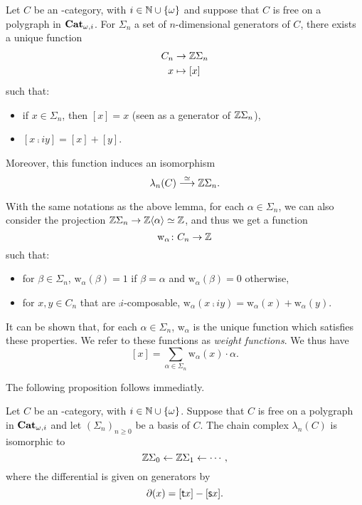 \documentclass{amsart}
\renewcommand{\sce}[1]{\source{} #1}
\renewcommand{\tge}[1]{\target{} #1}
\newcommand{\wght}[1]{\mathrm{w}_{#1}}
\begin{document}
\begin{lemma}\label{lemma:abelpol}
  Let $C$ be an \nbd-category, with $i \in \mathbb N\cup\left\{\omega\right\}$
  and suppose that $C$ is free on a polygraph in $\mathbf{Cat}_{\omega,i}$. For
  $\Sigma_n$ a set of $n$\nbd-dimensional generators of $C$, there
  exists a unique function
  \[
    \begin{aligned}
      C_n &\to \mathbb Z\Sigma_n\\
      x &\mapsto [x]
    \end{aligned}
  \]
  such that:
  \begin{itemize}
    \item if $x \in \Sigma_n$, then $[x]=x$ (seen as a generator of
      $\mathbb Z\Sigma_n$),
    \item $[x\comp{i} y]=[x]+[y]$.
    \end{itemize}
    Moreover, this function induces an isomorphism
    \[
      \lambda_n(C) \overset{\simeq}{\longrightarrow} \mathbb Z\Sigma_n.
    \]
  \end{lemma}
  \begin{paragr}
  With the same notations as the above lemma, for each $\alpha \in
  \Sigma_n$, we can also consider the projection $\mathbb Z \Sigma_n \to \mathbb Z
  \langle \alpha \rangle \simeq \mathbb Z$, and thus we get a
  function
  \[
    \wght{\alpha} \colon C_n \to \Z
  \]
  such that:
  \begin{itemize}
    \item for $\beta \in \Sigma_n$, $\wght{\alpha}(\beta)=1$ if $\beta=\alpha$ and $\wght{\alpha}(\beta)=0$
      otherwise,
    \item for $x,y \in C_n$ that are $\comp{i}$\nbd-composable, $\wght{\alpha}(x\comp{i}y)=\wght{\alpha}(x)+\wght{\alpha}(y)$.
    \end{itemize}
    It can be shown that, for each $\alpha \in \Sigma_n$, $\wght{\alpha}$ is the unique function which
    satisfies these properties. We refer to these functions as \emph{weight functions}. We thus
    have
    \[
      [x]=\sum_{\alpha \in \Sigma_n}\wght{\alpha}(x)\cdot \alpha.
    \]
\end{paragr}
The following proposition follows immediatly.
\begin{proposition}
  Let $C$ be an  \nbd-category, with $i \in \mathbb N\cup
  \left\{\omega\right\}$. Suppose that $C$ is free on a polygraph in
  $\mathbf{Cat}_{\omega,i}$ and let $(\Sigma_n)_{n \geq 0}$ be a basis of $C$. The
  chain complex $\lambda_n(C)$ is isomorphic to
  \[
    \mathbb Z \Sigma_0 \leftarrow \mathbb Z \Sigma_1 \leftarrow \cdots,
  \]
  where the differential is given on generators by
  \[
    \partial(x)=[\tge{x}]-[\sce{x}].
  \]
\end{proposition}
\end{document}
